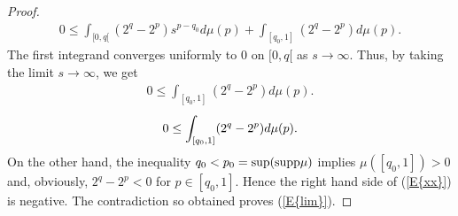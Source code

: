 \documentclass[12pt,leqno]{amsart}
\theoremstyle{definition}
\begin{document}
\begin{proof}
{{\begin{equation}
\begin{aligned}
{  0\leq\int_{[0,q[}(2^q-2^p)s^{p-q_0}d\mu(p)+\int_{[q_0,1]}(2^q-2^p)d\mu(p).
}\end{aligned}\end{equation}}}
The first integrand converges uniformly to $0$ on $[0,q[$ as $s\to\infty$.
Thus, by taking the limit $s\to\infty$, we get
{
  {\begin{equation*}\begin{aligned}{
  0\leq\int_{[q_0,1]}(2^q-2^p)d\mu(p).
}\end{aligned}\end{equation*}}
  {\begin{equation}\begin{aligned}\label{E{xx}}{
  0\leq\int_{[q_0,1]}(2^q-2^p)d\mu(p).
}\end{aligned}\end{equation}}}
On the other hand, the inequality $q_0<p_0={\mathop{\mbox{\rm sup}}}({\mathop{\mbox{\rm supp}}}\mu)$
implies $\mu([q_0,1])>0$ and, obviously, $2^q-2^p<0$ for $p\in[q_0,1]$. Hence
the right hand side of {{\rm(\ref{E{xx}})}} is negative. The contradiction so obtained proves
{{\rm(\ref{E{lim}})}}.
\end{proof}
\end{document}
